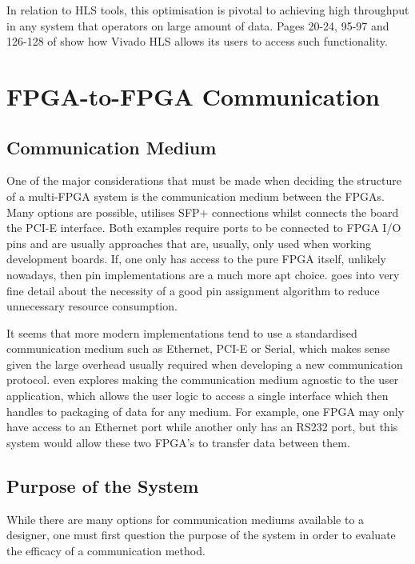 In relation to HLS tools, this optimisation is pivotal to achieving high throughput in any system that operators on large amount of data. Pages 20-24, 95-97 and 126-128 of \cite{vivado-optmisation-manual} show how Vivado HLS allows its users to access such functionality.


\section{FPGA-to-FPGA Communication}

\subsection{Communication Medium}

One of the major considerations that must be made when deciding the structure of a multi-FPGA system is the communication medium between the FPGAs. Many options are possible, \cite{10.1145/3358192} utilises SFP+ connections whilst \cite{10.1145/3337821.3337846} connects the board the PCI-E interface. Both examples require ports to be connected to FPGA I/O pins and are usually approaches that are, usually, only used when working development boards. If, one only has access to the pure FPGA itself, unlikely nowadays, then pin implementations are a much more apt choice. \cite{658564} goes into very fine detail about the necessity of a good pin assignment algorithm to reduce unnecessary resource consumption.

It seems that more modern implementations tend to use a standardised communication medium such as Ethernet, PCI-E or Serial, which makes sense given the large overhead usually required when developing a new communication protocol. \cite{7890234} even explores making the communication medium agnostic to the user application, which allows the user logic to access a single interface which then handles to packaging of data for any medium. For example, one FPGA may only have access to an Ethernet port while another only has an RS232 port, but this system would allow these two FPGA's to transfer data between them.

\subsection{Purpose of the System}

While there are many options for communication mediums available to a designer, one must first question the purpose of the system in order to evaluate the efficacy of a communication method. 

